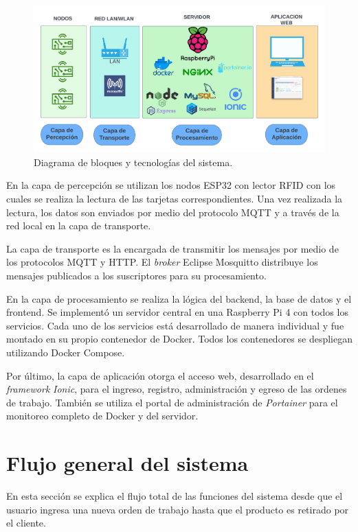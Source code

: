 \begin{figure}[H]
	\centering
	\includegraphics[width=\textwidth]{./Figures/diagramabloques.png}
	\caption{Diagrama de bloques y tecnologías del sistema.}
	\label{fig:diagramabloques}
\end{figure}


En la capa de percepción se utilizan los nodos ESP32 con lector RFID con los cuales se realiza la lectura de las tarjetas correspondientes. Una vez realizada la lectura, los datos son enviados por medio del protocolo MQTT y a través de la red local en la capa de transporte. 

La capa de transporte es la encargada de transmitir los mensajes por medio de los protocolos MQTT y HTTP. El \textit{broker} Eclipse Mosquitto distribuye los mensajes publicados a los suscriptores para su procesamiento.

En la capa de procesamiento se realiza la lógica del backend, la base de datos y el frontend. Se implementó un servidor central en una Raspberry Pi 4 con todos los servicios. Cada uno de los servicios está desarrollado de manera individual y fue montado en su propio contenedor de Docker. Todos los contenedores se despliegan utilizando Docker Compose.

Por último, la capa de aplicación otorga el acceso web, desarrollado en el \textit{framework } \textit{Ionic}, para el ingreso, registro, administración y egreso de las ordenes de trabajo. También se utiliza el portal de administración de \textit{Portainer} para el monitoreo completo de Docker y del servidor.


\section{Flujo general del sistema}
\label{sec:flujogeneral}
En esta sección se explica el flujo total de las funciones del sistema desde que el usuario ingresa una nueva orden de trabajo hasta que el producto es retirado por el cliente.

